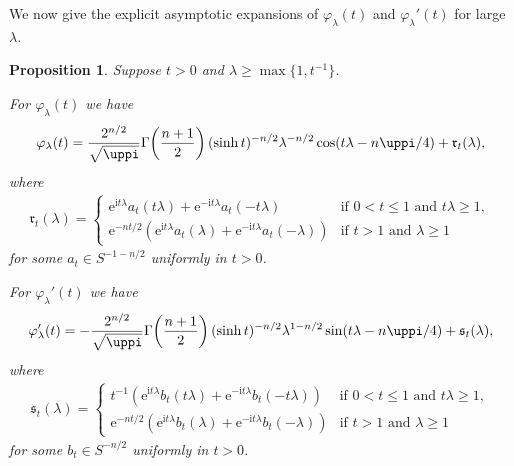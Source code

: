 \documentclass[a4paper,12pt]{amsart}
\numberwithin{equation}{section}
\newtheorem{proposition}[theorem]{Proposition}
\theoremstyle{definition}
\theoremstyle{remark}
\numberwithin{theorem}{section}
\newcommand{\e}{\mathrm{e}}
\renewcommand{\i}{\mathrm{i}}
\begin{document}
We now give the explicit asymptotic expansions of $\varphi_\lambda(t)$ and $\varphi_\lambda'(t)$ for large $\lambda$.
\begin{proposition}\label{prop4.1}
Suppose $t>0$ and $\lambda\geq \max\{1,t^{-1}\}$.
\begin{asparaenum}[\rm (a)]
\item For $\varphi_\lambda(t)$ we have
\begin{align*}
\varphi_\lambda(t)={2^{n/2}\over\sqrt{\uppi}}\Gamma\!\left({n+1\over 2}\right) (\sinh t)^{-n/2} \lambda^{-n/2}\cos(t\lambda-n\uppi/4)+\mathfrak{r}_t(\lambda),
\end{align*}
where
\begin{align*}
\mathfrak{r}_t(\lambda)=\begin{cases}
\e^{\i t\lambda}a_t(t\lambda)+\e^{-\i t\lambda}a_t(-t\lambda)&\mbox{if }0<t\leq 1 \mbox{ and }t\lambda\geq 1,\\
\e^{-nt/2}\left(\e^{\i t\lambda}a_t(\lambda)+\e^{-\i t\lambda}a_t(-\lambda)\right)&\mbox{if }t>1 \mbox{ and }\lambda\geq 1
\end{cases}
\end{align*}
for some $a_t\in S^{-1-n/2}$ uniformly in $t>0$.
\item For $\varphi_\lambda'(t)$ we have
\begin{align*}
\varphi_\lambda'(t)=-{2^{n/2}\over\sqrt{\uppi}}\Gamma\!\left({n+1\over 2}\right) (\sinh t)^{-n/2} \lambda^{1-n/2}\sin(t\lambda-n\uppi/4)+\mathfrak{s}_t(\lambda),
\end{align*}
where
\begin{align*}
\mathfrak{s}_t(\lambda)=\begin{cases}
t^{-1}\left(\e^{\i t\lambda}b_t(t\lambda)+\e^{-\i t\lambda}b_t(-t\lambda)\right)&\mbox{if }0<t\leq 1 \mbox{ and }t\lambda\geq 1,\\
\e^{-nt/2}\left(\e^{\i t\lambda}b_t(\lambda)+\e^{-\i t\lambda}b_t(-\lambda)\right)&\mbox{if }t>1 \mbox{ and }\lambda\geq 1
\end{cases}
\end{align*}
for some $b_t\in S^{-n/2}$ uniformly in $t>0$.
\end{asparaenum}
\end{proposition}
\end{document}

